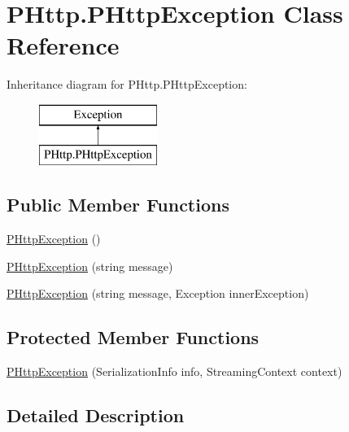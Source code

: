 \hypertarget{class_p_http_1_1_p_http_exception}{}\section{P\+Http.\+P\+Http\+Exception Class Reference}
\label{class_p_http_1_1_p_http_exception}
Inheritance diagram for P\+Http.\+P\+Http\+Exception\+:\begin{figure}[H]
\begin{center}
\leavevmode
\includegraphics[height=2.000000cm]{class_p_http_1_1_p_http_exception}
\end{center}
\end{figure}
\subsection*{Public Member Functions}
\begin{DoxyCompactItemize}
\item 
\hyperlink{class_p_http_1_1_p_http_exception_a37b72f2e0f121f2515473e55325b4e27}{P\+Http\+Exception} ()
\item 
\hyperlink{class_p_http_1_1_p_http_exception_a91948b6fb1be46bfddd6ba3e770ed235}{P\+Http\+Exception} (string message)
\item 
\hyperlink{class_p_http_1_1_p_http_exception_a81280222492923fbff1782365f8e0789}{P\+Http\+Exception} (string message, Exception inner\+Exception)
\end{DoxyCompactItemize}
\subsection*{Protected Member Functions}
\begin{DoxyCompactItemize}
\item 
\hyperlink{class_p_http_1_1_p_http_exception_a1a15e386e4ccda2c1e275dde1d53f995}{P\+Http\+Exception} (Serialization\+Info info, Streaming\+Context context)
\end{DoxyCompactItemize}


\subsection{Detailed Description}


